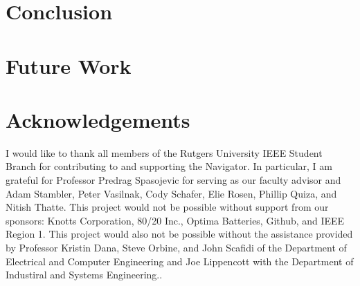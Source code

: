 \documentclass[11pt,twocolumn]{article}
\begin{document}
\section{Conclusion}
\label{sec:conclusion}

\section{Future Work}
\label{sec:future}

\section{Acknowledgements}
I would like to thank all members of the Rutgers University IEEE Student Branch
for contributing to and supporting the Navigator. In particular, I am grateful
for Professor Predrag Spasojevic for serving as our faculty advisor and Adam
Stambler, Peter Vasilnak, Cody Schafer, Elie Rosen, Phillip Quiza, and Nitish
Thatte. This project would not be possible without support from our sponsors:
Knotts Corporation, 80/20 Inc., Optima Batteries, Github, and IEEE Region 1.
This project would also not be possible without the assistance provided by
Professor Kristin Dana, Steve Orbine, and John Scafidi of the Department of
Electrical and Computer Engineering and Joe Lippencott with the Department of
Industiral and Systems Engineering..
\end{document}
